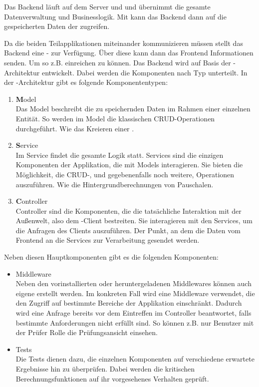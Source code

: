 Das Backend läuft auf dem Server und und übernimmt die gesamte Datenverwaltung und Businesslogik. Mit  kann das Backend dann auf die gespeicherten Daten der  zugreifen.

Da die beiden Teilapplikationen miteinander kommunizieren müssen stellt das Backend eine - zur Verfügung. Über diese kann dann das Frontend Informationen senden. Um so z.B.  einreichen zu können.
Das Backend wird auf Basis der -Architektur entwickelt. Dabei werden die Komponenten nach Typ unterteilt. In der -Architektur gibt es folgende Komponententypen:

\begin{enumerate}
  \item \textbf{M}odel\\
  Das Model beschreibt die zu speichernden Daten im Rahmen einer einzelnen Entität. So werden im Model die klassischen CRUD-Operationen durchgeführt. Wie das Kreieren einer .
  \item \textbf{S}ervice\\
  Im Service findet die gesamte Logik statt. Services sind die einzigen Komponenten der Applikation, die mit Models interagieren. Sie bieten die Möglichkeit, die CRUD-, und gegebenenfalls noch weitere, Operationen auszuführen. Wie die Hintergrundberechnungen von Pauschalen.
  \item \textbf{C}ontroller\\
  Controller sind die Komponenten, die die tatsächliche Interaktion mit der Außenwelt, also dem -Client bestreiten. Sie interagieren mit den Services, um die Anfragen des Clients auszuführen. Der Punkt, an dem die Daten vom Frontend an die Services zur Verarbeitung gesendet werden.
\end{enumerate}

Neben diesen Hauptkomponenten gibt es die folgenden Komponenten:

\begin{itemize}
  \item Middleware\\
Neben den vorinstallierten oder heruntergeladenen Middlewares können auch eigene erstellt werden. Im konkreten Fall wird eine Middleware verwendet, die den Zugriff auf bestimmte Bereiche der Applikation einschränkt. Dadurch wird eine Anfrage bereits vor dem Eintreffen im Controller beantwortet, falls bestimmte Anforderungen nicht erfüllt sind. So können z.B. nur Benutzer mit der Prüfer Rolle die Prüfungsansicht einsehen.
  \item Tests\\
  Die Tests dienen dazu, die einzelnen Komponenten auf verschiedene erwartete Ergebnisse hin zu überprüfen. Dabei werden die kritischen Berechnungsfunktionen auf ihr vorgesehenes Verhalten geprüft.
\end{itemize}

